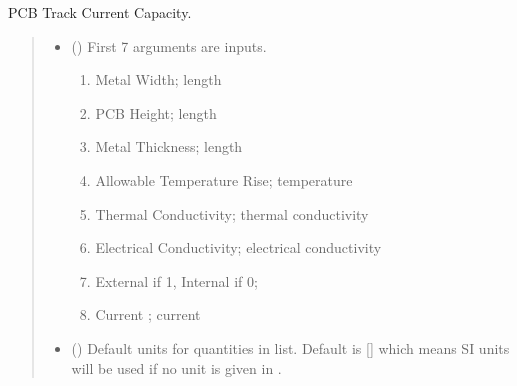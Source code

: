 \documentclass[letterpaper,10pt,english]{sphinxmanual}
\begin{document}

\begin{fulllineitems}
\label{\detokenize{components:components.PCBTrackCurrentCapacity}}
\pysigstartsignatures
{}
\pysigstopsignatures
\sphinxAtStartPar
PCB Track Current Capacity.
\begin{quote}\begin{description}
\begin{itemize}
\item {} 
\sphinxAtStartPar
{} () \textendash{} 
\sphinxAtStartPar
First 7 arguments are inputs.
\begin{enumerate}
%
\item {} 
\sphinxAtStartPar
Metal Width;  length

\item {} 
\sphinxAtStartPar
PCB Height;     length

\item {} 
\sphinxAtStartPar
Metal Thickness;        length

\item {} 
\sphinxAtStartPar
Allowable Temperature Rise; temperature

\item {} 
\sphinxAtStartPar
Thermal Conductivity;  thermal conductivity

\item {} 
\sphinxAtStartPar
Electrical Conductivity; electrical conductivity

\item {} 
\sphinxAtStartPar
External if 1, Internal if 0;

\item {} 
\sphinxAtStartPar
Current ; current

\end{enumerate}


\item {} 
\sphinxAtStartPar
{} (\sphinxstyleliteralemphasis{\sphinxupquote{, }}) \textendash{} Default units for quantities in  list. Default is {[}{]} which means SI units will be used if no unit is given in .


\end{itemize}
\end{description}
\end{quote}
\end{fulllineitems}
\end{document}
